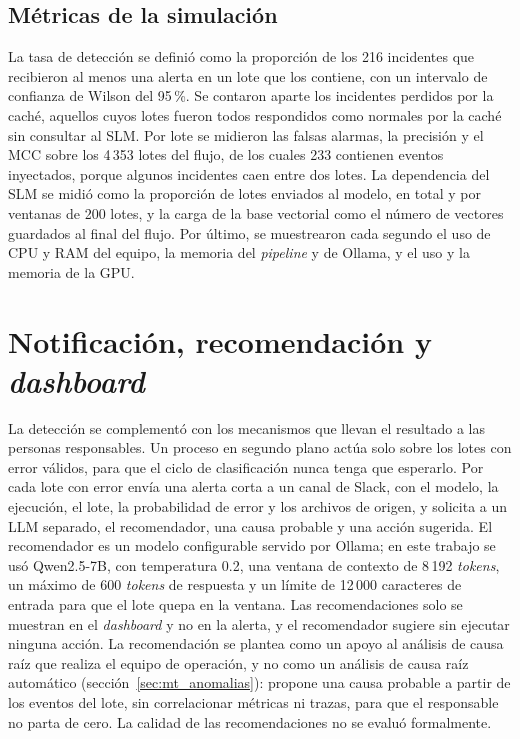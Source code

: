 \subsection{Métricas de la simulación}

La tasa de detección se definió como la proporción de los 216 incidentes que recibieron al menos una alerta en un lote que los contiene, con un intervalo de confianza de Wilson del 95\,\%. Se contaron aparte los incidentes perdidos por la caché, aquellos cuyos lotes fueron todos respondidos como normales por la caché sin consultar al SLM. Por lote se midieron las falsas alarmas, la precisión y el MCC sobre los 4\,353 lotes del flujo, de los cuales 233 contienen eventos inyectados, porque algunos incidentes caen entre dos lotes. La dependencia del SLM se midió como la proporción de lotes enviados al modelo, en total y por ventanas de 200 lotes, y la carga de la base vectorial como el número de vectores guardados al final del flujo. Por último, se muestrearon cada segundo el uso de CPU y RAM del equipo, la memoria del \textit{pipeline} y de Ollama, y el uso y la memoria de la GPU.

\section{Notificación, recomendación y \textit{dashboard}}\label{sec:met_notificacion}\label{sec:met_dashboard}

La detección se complementó con los mecanismos que llevan el resultado a las personas responsables. Un proceso en segundo plano actúa solo sobre los lotes con error válidos, para que el ciclo de clasificación nunca tenga que esperarlo. Por cada lote con error envía una alerta corta a un canal de Slack, con el modelo, la ejecución, el lote, la probabilidad de error y los archivos de origen, y solicita a un LLM separado, el recomendador, una causa probable y una acción sugerida. El recomendador es un modelo configurable servido por Ollama; en este trabajo se usó Qwen2.5-7B, con temperatura 0.2, una ventana de contexto de 8\,192 \textit{tokens}, un máximo de 600 \textit{tokens} de respuesta y un límite de 12\,000 caracteres de entrada para que el lote quepa en la ventana. Las recomendaciones solo se muestran en el \textit{dashboard} y no en la alerta, y el recomendador sugiere sin ejecutar ninguna acción. La recomendación se plantea como un apoyo al análisis de causa raíz que realiza el equipo de operación, y no como un análisis de causa raíz automático (sección~\ref{sec:mt_anomalias}): propone una causa probable a partir de los eventos del lote, sin correlacionar métricas ni trazas, para que el responsable no parta de cero. La calidad de las recomendaciones no se evaluó formalmente.


